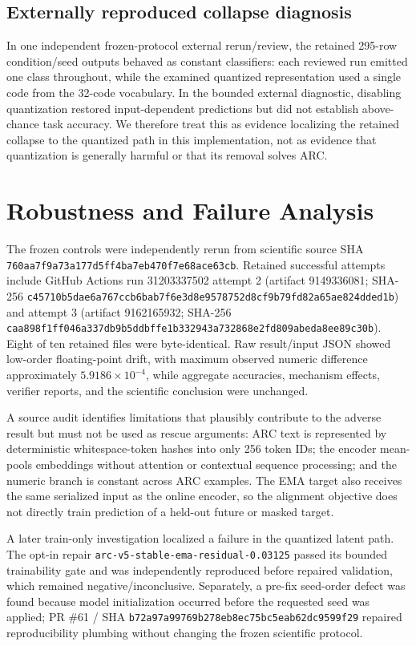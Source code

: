 \documentclass[11pt]{article}
\begin{document}
\subsection{Externally reproduced collapse diagnosis}
In one independent frozen-protocol external rerun/review, the retained 295-row condition/seed outputs behaved as constant classifiers: each reviewed run emitted one class throughout, while the examined quantized representation used a single code from the 32-code vocabulary. In the bounded external diagnostic, disabling quantization restored input-dependent predictions but did not establish above-chance task accuracy. We therefore treat this as evidence localizing the retained collapse to the quantized path in this implementation, not as evidence that quantization is generally harmful or that its removal solves ARC.

\section{Robustness and Failure Analysis}
The frozen controls were independently rerun from scientific source SHA \texttt{760aa7f9a73a177d5ff4ba7eb470f7e68ace63cb}. Retained successful attempts include GitHub Actions run 31203337502 attempt 2 (artifact 9149336081; SHA-256 \texttt{c45710b5dae6a767ccb6bab7f6e3d8e9578752d8cf9b79fd82a65ae824dded1b}) and attempt 3 (artifact 9162165932; SHA-256 \texttt{caa898f1ff046a337db9b5ddbffe1b332943a732868e2fd809abeda8ee89c30b}). Eight of ten retained files were byte-identical. Raw result/input JSON showed low-order floating-point drift, with maximum observed numeric difference approximately $5.9186\times10^{-4}$, while aggregate accuracies, mechanism effects, verifier reports, and the scientific conclusion were unchanged.

A source audit identifies limitations that plausibly contribute to the adverse result but must not be used as rescue arguments: ARC text is represented by deterministic whitespace-token hashes into only 256 token IDs; the encoder mean-pools embeddings without attention or contextual sequence processing; and the numeric branch is constant across ARC examples. The EMA target also receives the same serialized input as the online encoder, so the alignment objective does not directly train prediction of a held-out future or masked target.

A later train-only investigation localized a failure in the quantized latent path. The opt-in repair \texttt{arc-v5-stable-ema-residual-0.03125} passed its bounded trainability gate and was independently reproduced before repaired validation, which remained negative/inconclusive. Separately, a pre-fix seed-order defect was found because model initialization occurred before the requested seed was applied; PR \#61 / SHA \texttt{b72a97a99769b278eb8ec75bc5eab62dc9599f29} repaired reproducibility plumbing without changing the frozen scientific protocol.
\end{document}
